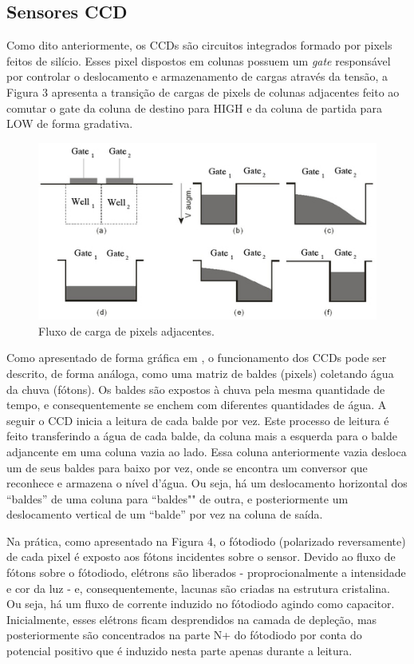 \documentclass[11pt,a4paper,twocolumn]{article}
\begin{document}
	\subsection*{Sensores CCD}
	Como dito anteriormente, os CCDs são circuitos integrados formado por pixels feitos de silício. Esses pixel dispostos em colunas possuem um \textit{gate} responsável por controlar o deslocamento e armazenamento de cargas através da tensão, a Figura 3 apresenta a transição de cargas de pixels de colunas adjacentes feito ao comutar o gate da coluna de destino para HIGH e da coluna de partida para LOW de forma gradativa.
	
	\begin{figure}[!ht]
		\centering
		\includegraphics[scale=0.52]{imagens/ccd.jpg}
		\caption{Fluxo de carga de pixels adjacentes.}
	\end{figure}
		
	Como apresentado de forma gráfica em \cite{Spectral}, o funcionamento dos CCDs pode ser descrito, de forma análoga, como uma matriz de baldes (pixels) coletando água da chuva (fótons). Os baldes são expostos à chuva pela mesma quantidade de tempo, e consequentemente se enchem com diferentes quantidades de água. A seguir o CCD inicia a leitura de cada balde por vez. Este processo de leitura é feito transferindo a água de cada balde, da coluna mais a esquerda para o balde adjancente em uma coluna vazia ao lado. Essa coluna anteriormente vazia desloca um de seus baldes para baixo por vez, onde se encontra um conversor que reconhece e armazena o nível d'água. Ou seja, há um deslocamento horizontal dos ``baldes'' de uma coluna para ``baldes"" de outra, e posteriormente um deslocamento vertical de um ``balde'' por vez na coluna de saída.
	
	Na prática, como apresentado na Figura 4, o fótodiodo (polarizado reversamente) de cada pixel é exposto aos fótons incidentes sobre o sensor. Devido ao fluxo de fótons sobre o fótodiodo, elétrons são liberados - proprocionalmente a intensidade e cor da luz - e, consequentemente, lacunas são criadas na estrutura cristalina. Ou seja, há um fluxo de corrente induzido no fótodiodo agindo como capacitor. Inicialmente, esses elétrons ficam desprendidos na camada de depleção, mas posteriormente são concentrados na parte N+ do fótodiodo por conta do potencial positivo que é induzido nesta parte apenas durante a leitura.
	
\end{document}
